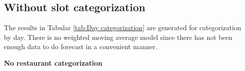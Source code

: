 \subsection{Without slot categorization}
The results in Tabular \ref{tab:Day categorization} are generated for categorization by day. There is no weighted moving average model since there has not been enough data to do forecast in a convenient manner.
\begin{table}[h]
\centering
\caption{Day categorization without slot}
\label{tab:Day categorization}
\end{table}
\newline\newline\textbf{No restaurant categorization}\newline
